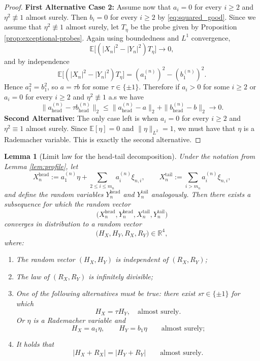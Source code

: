 \documentclass[11pt]{amsart}
\newtheorem{lemma}[theorem]{Lemma}
\newcommand{\E}{\mathbb E}
\newcommand{\R}{\mathbb R}
\begin{document}
\begin{proof}
\textbf{First Alternative Case 2:}
Assume now that $a_i=0$ for every $i\ge 2$ and $\eta^2 \not \equiv 1$ almost surely. Then $b_i=0$ for every $i \ge 2$ by \eqref{eq:squared_good}. Since we assume that $\eta^2 \not\equiv 1$ almost
surely, let $T_\eta$ be the probe given by Proposition
\ref{prop:exceptional-probes}. Again using boundedness and $L^1$ convergence,
\[
\E\bigl[(|X_n|^2-|Y_n|^2) T_\eta\bigr] \longrightarrow 0,
\]
and by independence
\[
\E\bigl[(|X_n|^2-|Y_n|^2) T_\eta\bigr]
=
(a_1^{(n)})^2-(b_1^{(n)})^2.
\]
Hence $a_1^2=b_1^2$, so $a=\tau b$ for some $\tau \in \{\pm 1\}$. Therefore if $a_i>0$ for some $i\ge 2$ or $a_i=0$ for every $i\ge 2$ and $\eta^2 \not \equiv1$ a.s we have 
\[
\|a^{(n)}_{\mathrm{head}} - \tau b^{(n)}_{\mathrm{head}}\|_2
\le
\|a^{(n)}_{\mathrm{head}}-a\|_2
+
\|b^{(n)}_{\mathrm{head}}-b\|_2
\longrightarrow 0.
\]
\textbf{Second Alternative:} The only case left is when $a_i=0$ for every $i\ge 2$ and $\eta^2\equiv1$ almost surely. Since $\E[\eta]=0$ and $\|\eta\|_{L^2}=1$, we must have that $\eta$ is a Rademacher variable.
This is exactly the second alternative.


\end{proof}

\begin{lemma}[Limit law for the head-tail decomposition]
\label{lem:limit-law}
Under the notation from Lemma \ref{lem:profile}, let
\[
X_n^{\mathrm{head}} := a_1^{(n)}\eta + \sum_{2 \le i \le m_n} a_i^{(n)} \xi_{n,i},
\qquad
X_n^{\mathrm{tail}} := \sum_{i > m_n} a_i^{(n)} \xi_{n,i},
\]
and define the random variables $Y_n^{\mathrm{head}}$ and $Y_n^{\mathrm{tail}}$ analogously. Then there exists a subsequence for which the random vector 
\[
\bigl(
X_n^{\mathrm{head}},
Y_n^{\mathrm{head}},
X_n^{\mathrm{tail}},
Y_n^{\mathrm{tail}}
\bigr)
\]
converges in distribution to a random vector
\[
\bigl(
H_X,H_Y,R_X,R_Y
\bigr)
\in \R^4,
\]
where:
\begin{enumerate}
\renewcommand{\labelenumi}{\Roman{enumi}.}
\item The random vector $(H_X,H_Y)$ is independent of $(R_X,R_Y)$;
\item The law of $(R_X,R_Y)$ is infinitely divisible;
\item One of the following alternatives must be true: there exist s$\tau \in \{\pm 1\}$ for which 
\[
H_X = \tau H_Y, \quad \text{almost surely.}
\]
Or $\eta$ is a Rademacher variable and
\[
H_X = a_1 \eta,
\qquad
H_Y = b_1 \eta
\qquad
\text{almost surely;}
\]
\item It holds that
\[
|H_X + R_X| = |H_Y + R_Y|
\qquad
\text{almost surely.}
\]
\end{enumerate}
\end{lemma}
\end{document}
